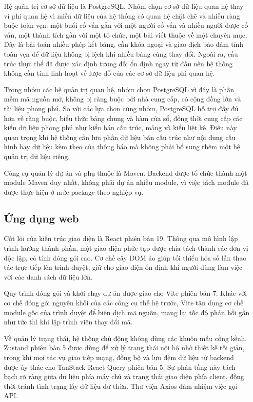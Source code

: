 \documentclass[12pt,a4paper,oneside]{report}
\begin{document}
Hệ quản trị cơ sở dữ liệu là PostgreSQL. Nhóm chọn cơ sở dữ liệu quan hệ thay vì phi quan hệ vì miền dữ liệu của hệ thống có quan hệ chặt chẽ và nhiều ràng buộc toàn vẹn: một buổi cố vấn gắn với một người cố vấn và nhiều người được cố vấn, một thành tích gắn với một tổ chức, một bài viết thuộc về một chuyên mục. Đây là bài toán nhiều phép kết bảng, cần khóa ngoại và giao dịch bảo đảm tính toàn vẹn để dữ liệu không bị lệch khi nhiều bảng cùng thay đổi. Ngoài ra, cấu trúc thực thể đã được xác định tương đối ổn định ngay từ đầu nên hệ thống không cần tính linh hoạt về lược đồ của các cơ sở dữ liệu phi quan hệ.

Trong nhóm các hệ quản trị quan hệ, nhóm chọn PostgreSQL vì đây là phần mềm mã nguồn mở, không bị ràng buộc bởi nhà cung cấp, có cộng đồng lớn và tài liệu phong phú. So với các lựa chọn cùng nhóm, PostgreSQL hỗ trợ đầy đủ hơn về ràng buộc, biểu thức bảng chung và hàm cửa sổ, đồng thời cung cấp các kiểu dữ liệu phong phú như kiểu bán cấu trúc, mảng và kiểu liệt kê. Điều này quan trọng khi hệ thống cần lưu phần dữ liệu bán cấu trúc như nội dung cấu hình hay dữ liệu kèm theo của thông báo mà không phải bổ sung thêm một hệ quản trị dữ liệu riêng.

Công cụ quản lý dự án và phụ thuộc là Maven. Backend được tổ chức thành một module Maven duy nhất, không phải dự án nhiều module, vì việc tách module đã được thực hiện ở mức package theo nghiệp vụ.

\subsection{Ứng dụng web}

Cốt lõi của kiến trúc giao diện là React phiên bản 19. Thông qua mô hình lập trình hướng thành phần, một giao diện phức tạp được chia tách thành các đơn vị độc lập, có tính đóng gói cao. Cơ chế cây DOM ảo giúp tối thiểu hóa số lần thao tác trực tiếp lên trình duyệt, giữ cho giao diện ổn định khi người dùng làm việc với các danh sách dữ liệu lớn.

Quy trình đóng gói và khởi chạy dự án được giao cho Vite phiên bản 7. Khác với cơ chế đóng gói nguyên khối của các công cụ thế hệ trước, Vite tận dụng cơ chế module gốc của trình duyệt để biên dịch mã nguồn, mang lại tốc độ phản hồi gần như tức thì khi lập trình viên thay đổi mã.

Về quản lý trạng thái, hệ thống chủ động không dùng các khuôn mẫu cồng kềnh. Zustand phiên bản 5 được dùng để xử lý trạng thái nội bộ nhờ thiết kế tối giản, trong khi mọi tác vụ giao tiếp mạng, đồng bộ và lưu đệm dữ liệu từ backend được ủy thác cho TanStack React Query phiên bản 5. Sự phân tầng này tách bạch rõ ràng giữa dữ liệu phía máy chủ và trạng thái giao diện phía client, đồng thời tránh tình trạng lấy dữ liệu dư thừa. Thư viện Axios đảm nhiệm việc gọi API.
\end{document}
